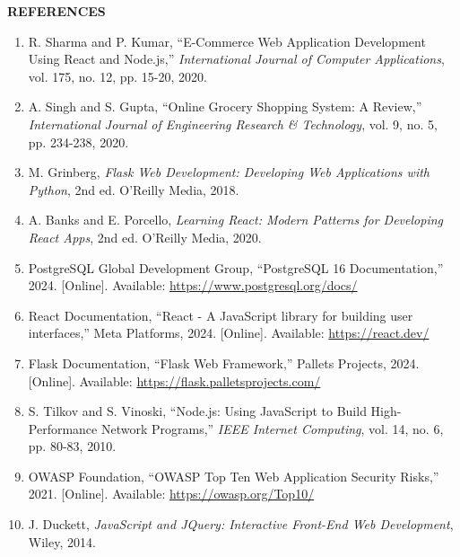 \documentclass[12pt,a4paper]{report}
\begin{document}
\begin{center}
    \textbf{\Large REFERENCES}
\end{center}

\vspace{10pt}

\begin{enumerate}

\item R. Sharma and P. Kumar, ``E-Commerce Web Application Development Using React and Node.js,'' \textit{International Journal of Computer Applications}, vol. 175, no. 12, pp. 15-20, 2020.

\item A. Singh and S. Gupta, ``Online Grocery Shopping System: A Review,'' \textit{International Journal of Engineering Research \& Technology}, vol. 9, no. 5, pp. 234-238, 2020.

\item M. Grinberg, \textit{Flask Web Development: Developing Web Applications with Python}, 2nd ed. O'Reilly Media, 2018.

\item A. Banks and E. Porcello, \textit{Learning React: Modern Patterns for Developing React Apps}, 2nd ed. O'Reilly Media, 2020.

\item PostgreSQL Global Development Group, ``PostgreSQL 16 Documentation,'' 2024. [Online]. Available: \url{https://www.postgresql.org/docs/}

\item React Documentation, ``React - A JavaScript library for building user interfaces,'' Meta Platforms, 2024. [Online]. Available: \url{https://react.dev/}

\item Flask Documentation, ``Flask Web Framework,'' Pallets Projects, 2024. [Online]. Available: \url{https://flask.palletsprojects.com/}

\item S. Tilkov and S. Vinoski, ``Node.js: Using JavaScript to Build High-Performance Network Programs,'' \textit{IEEE Internet Computing}, vol. 14, no. 6, pp. 80-83, 2010.

\item OWASP Foundation, ``OWASP Top Ten Web Application Security Risks,'' 2021. [Online]. Available: \url{https://owasp.org/Top10/}

\item J. Duckett, \textit{JavaScript and JQuery: Interactive Front-End Web Development}, Wiley, 2014.


\end{enumerate}
\end{document}
